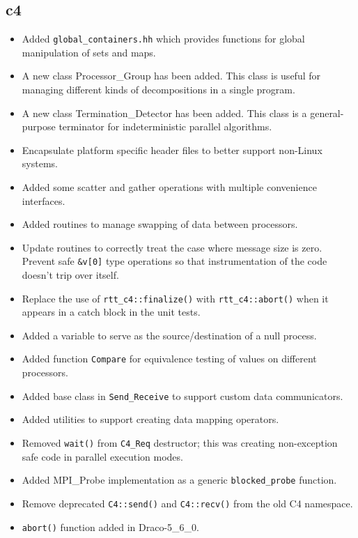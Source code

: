 \documentclass[note]{ResearchNote}
\newcommand{\draco}{Draco}
\begin{document}
\subsection{c4}
\label{changes:c4}
\begin{itemize}
\item Added \texttt{global\_containers.hh} which provides functions
  for global manipulation of sets and maps.
\item A new class \textsf{Processor\_Group} has been added. This class
  is useful for managing different kinds of decompositions in a single
  program. 
\item A new class \textsf{Termination\_Detector} has been added. This
  class is a general-purpose terminator for indeterministic parallel
  algorithms. 
\item Encapsulate platform specific header files to better support
  non-Linux systems.
\item Added some scatter and gather operations with multiple
  convenience interfaces.
\item Added routines to manage swapping of data between processors.
\item Update routines to correctly treat the case where message size
  is zero.  Prevent safe \texttt{\&v[0]} type operations so that
  instrumentation of the code doesn't trip over itself.
\item Replace the use of \texttt{rtt\_c4::finalize()} with
  \texttt{rtt\_c4::abort()} when it appears in a catch block in the
  unit tests. 
\item Added a variable to serve as the source/destination of a null
  process.
\item Added function \texttt{Compare} for equivalence testing of
  values on different processors.
\item Added base class in \texttt{Send\_Receive} to support custom
  data communicators.
\item Added utilities to support creating data mapping operators.
\item Removed \texttt{wait()} from \texttt{C4\_Req} destructor; this
  was creating non-exception safe code in parallel execution modes.
\item Added \textsf{MPI\_Probe} implementation as a generic
  \texttt{blocked\_probe} function.
\item Remove deprecated \texttt{C4::send()} and \texttt{C4::recv()}
  from the old C4 namespace.
\item \texttt{abort()} function added in \draco-5\_6\_0.
\end{itemize}
\end{document}

